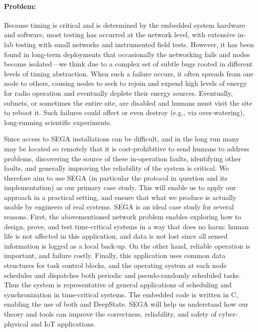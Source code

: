 \paragraph{Problem:}

Because timing is critical and is determined by the embedded system hardware and software, most testing has occurred at the network level, with extensive in-lab testing with small networks and instrumented field tests.
However, it has been found in long-term deployments %
that occasionally the networking fails and nodes become isolated---we think due to a complex set of subtle bugs rooted in different levels of timing abstraction.
When such a failure occurs, it often spreads from one node to others,
causing nodes to seek to rejoin and expend high levels of energy for radio operation and eventually deplete their energy sources.
Eventually, subnets, or sometimes the entire site, are disabled and humans must visit the site to reboot it.
Such failures could %
affect %
or even destroy (e.g., via over-watering), long-running scientific experiments.


Since access to SEGA installations can be difficult, and in the long run many may be located so remotely that it is cost-prohibitive to send humans to address problems, discovering the source of these in-operation faults, identifying other faults, and generally improving the reliability of the system is critical.
We therefore aim to use SEGA (in particular the protocol in question and its implementation) as our primary case study.
This will enable us to apply our approach in a practical setting, and ensure that what we produce is actually usable by engineers of real systems.
%
SEGA is an ideal case study for several reasons.
First, the abovementioned network problem enables exploring how to design, prove, and test time-critical systems in a way that does no harm: human life is not affected in this application, and data is not lost since all sensed information is logged as a local back-up.
On the other hand, reliable operation is important, and failure costly. %
Finally, this application uses common data structures for task control blocks, and the operating system at each node schedules and dispatches both periodic and pseudo-randomly scheduled tasks.
Thus the system is representative of %
general applications of scheduling and synchronization in time-critical systems.
The embedded code is written in C, enabling the use of both \framac and DeepState.
SEGA will help us understand how our theory and tools can improve the correctness, reliability, and safety of cyber-physical and IoT applications.


